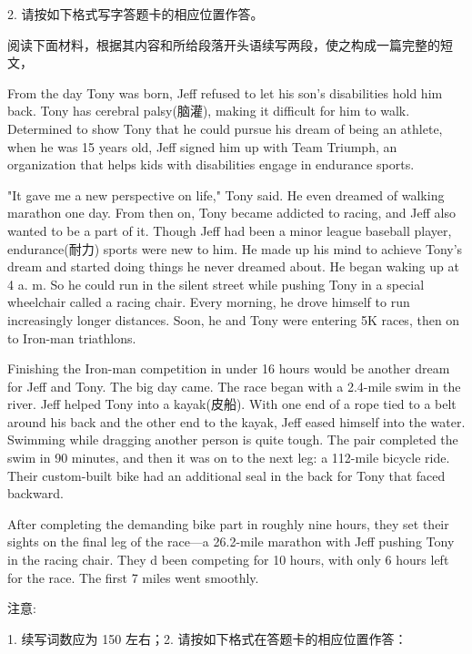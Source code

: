 \documentclass{英语试卷}
\begin{document}
\par 2. 请按如下格式写字答题卡的相应位置作答。\par
{}
\par 阅读下面材料，根据其内容和所给段落开头语续写两段，使之构成一篇完整的短文，\par
\par From the day Tony was born, Jeff refused to let his son's disabilities hold him back. Tony has cerebral palsy(脑灌), making it difficult for him to walk. Determined to show Tony that he could pursue his dream of being an athlete, when he was 15 years old, Jeff signed him up with Team Triumph, an organization that helps kids with disabilities engage in endurance sports.\par
\par "It gave me a new perspective on life," Tony said. He even dreamed of walking marathon one day. From then on, Tony became addicted to racing, and Jeff also wanted to be a part of it. Though Jeff had been a minor league baseball player, endurance(耐力) sports were new to him. He made up his mind to achieve Tony's dream and started doing things he never dreamed about. He began waking up at 4 a. m. So he could run in the silent street while pushing Tony in a special wheelchair called a racing chair. Every morning, he drove himself to run increasingly longer distances. Soon, he and Tony were entering 5K races, then on to Iron-man triathlons.\par
\par Finishing the Iron-man competition in under 16 hours would be another dream for Jeff and Tony. The big day came. The race began with a 2.4-mile swim in the river. Jeff helped Tony into a kayak(皮船). With one end of a rope tied to a belt around his back and the other end to the kayak, Jeff eased himself into the water. Swimming while dragging another person is quite tough. The pair completed the swim in 90 minutes, and then it was on to the next leg: a 112-mile bicycle ride. Their custom-built bike had an additional seal in the back for Tony that faced backward.\par
\par After completing the demanding bike part in roughly nine hours, they set their sights on the final leg of the race—a 26.2-mile marathon with Jeff pushing Tony in the racing chair. They d been competing for 10 hours, with only 6 hours left for the race. The first 7 miles went smoothly.\par
\par 注意:\par
\par 1. 续写词数应为 150 左右；2. 请按如下格式在答题卡的相应位置作答：\par
{}
\end{document}
